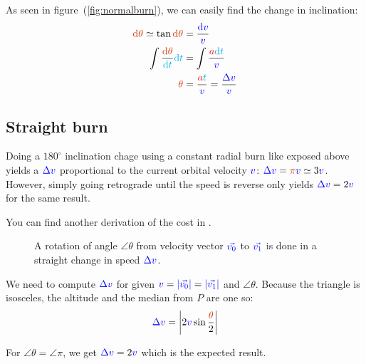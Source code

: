 As seen in figure~(\ref{fig:normalburn}), we can easily find the change
in inclination:
\begin{align*}
\angle{\d \theta}
\simeq
\tan \angle{\d \theta}
&=
\frac {\speed{\d v}} {\speed{v}}
\\
\int \frac {\angle{\d \theta}} {\delay{\dt}} \delay{\dt}
&=
\int \frac {\accel{a} \delay{\dt}} {\speed{v}}
\\
\angle{\theta}
&=
\frac {\accel{a} \delay{t}} {\speed{v}}
=
\frac {\speed{\Delta v}} {\speed{v}}
\end{align*}


\subsection{Straight burn}

Doing a $180^{\circ}$ inclination chage using a constant radial burn like
exposed above yields a $\textcolor{blue}{\Delta v}$ proportional to the current
orbital velocity $\textcolor{blue}{v}$: $\speed{\Delta v} = \angle{\pi} \speed{v}
\simeq 3 \speed{v}$. However, simply going retrograde until the speed is
reverse only yields $\textcolor{blue}{\Delta v} = 2 \textcolor{blue}{v}$ for the same result.

You can find another derivation of the cost in \cite[page
2]{incproof,incproof2}.

\begin{figure}[H]
\centering
{}
\caption{
	A rotation of angle $\angle{\theta}$ from velocity vector
	$\textcolor{blue}{\vec{v_0}}$ to $\textcolor{blue}{\vec{v_1}}$ is done in a straight
	change in speed $\textcolor{blue}{\Delta v}$.
}
\end{figure}

We need to compute $\textcolor{blue}{\Delta v}$ for given $\textcolor{blue}{v} =
\textcolor{blue}{|\vec{v_0}|} = \textcolor{blue}{|\vec{v_1}|}$ and $\angle{\theta}$. Because
the triangle is isosceles, the altitude and the median from $P$ are
one so:
\[
\speed{\Delta v}
=
\left|2 \speed{v} \sin \frac {\angle{\theta}} 2\right|
\]

For $\angle{\theta} = \angle{\pi}$, we get $\textcolor{blue}{\Delta v} = 2
\textcolor{blue}{v}$ which is the expected result.

